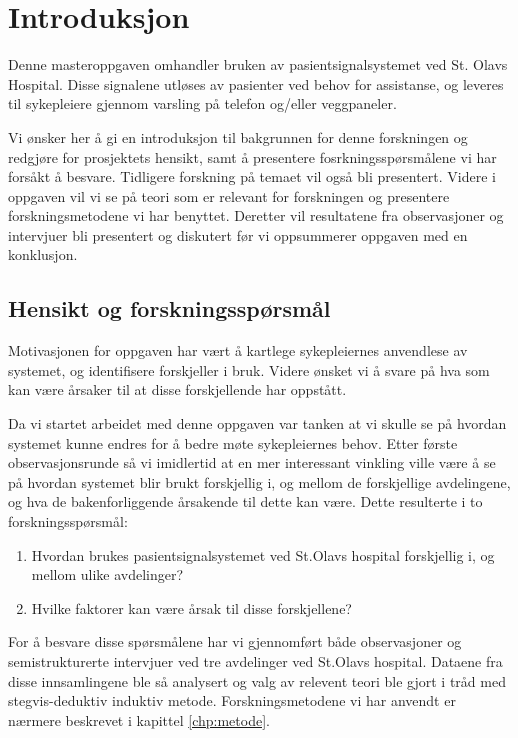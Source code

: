 \chapter{Introduksjon}
\label{chp:introduksjon}

Denne masteroppgaven omhandler bruken av pasientsignalsystemet ved St. Olavs Hospital. Disse signalene utløses av pasienter ved behov for assistanse, og leveres til sykepleiere gjennom varsling på telefon og/eller veggpaneler. 

\noindent
Vi ønsker her å gi en introduksjon til bakgrunnen for denne forskningen og redgjøre for prosjektets hensikt, samt å presentere fosrkningsspørsmålene vi har forsåkt å besvare. Tidligere forskning på temaet vil også bli presentert. Videre i oppgaven vil vi se på teori som er relevant for forskningen og presentere forskningsmetodene vi har benyttet. Deretter vil resultatene fra observasjoner og intervjuer bli presentert og diskutert før vi oppsummerer oppgaven med en konklusjon.

\section{Hensikt og forskningsspørsmål}
Motivasjonen for oppgaven har vært å kartlege sykepleiernes anvendlese av systemet, og identifisere forskjeller i bruk. Videre ønsket vi å svare på hva som kan være årsaker til at disse forskjellende har oppstått. 

\noindent
Da vi startet arbeidet med denne oppgaven var tanken at vi skulle se på hvordan systemet kunne endres for å bedre møte sykepleiernes behov. Etter første observasjonsrunde så vi imidlertid at en mer interessant vinkling ville være å se på hvordan systemet blir brukt forskjellig i, og mellom de forskjellige avdelingene, og hva de bakenforliggende årsakende til dette kan være. Dette resulterte i to forskningsspørsmål:

\begin{enumerate}
\item Hvordan brukes pasientsignalsystemet ved St.Olavs hospital forskjellig i, og mellom ulike avdelinger? 
\item Hvilke faktorer kan være årsak til disse forskjellene?
\end{enumerate}

\noindent
For å besvare disse spørsmålene har vi gjennomført både observasjoner og semistrukturerte intervjuer ved tre avdelinger ved St.Olavs hospital. Dataene fra disse innsamlingene ble så analysert og valg av relevent teori ble gjort i tråd med stegvis-deduktiv induktiv metode. Forskningsmetodene vi har anvendt er nærmere beskrevet i kapittel \ref{chp:metode}.


